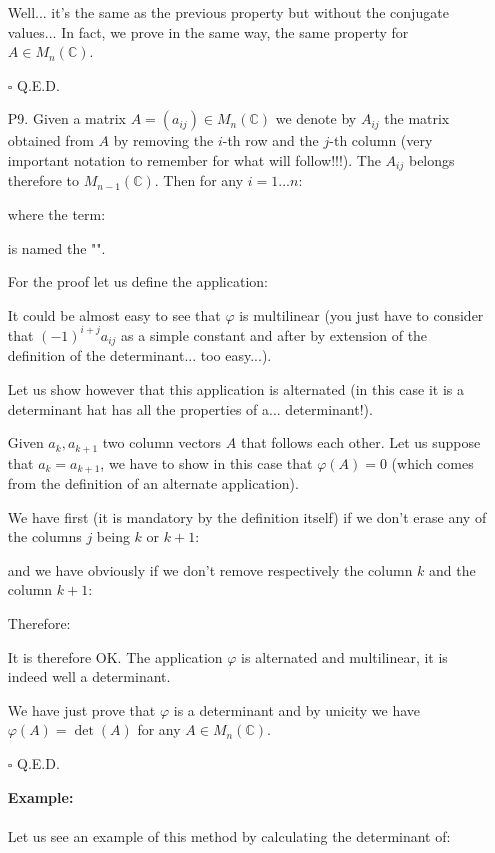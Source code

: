 \begin{enumerate}
		\begin{dem}
		Well... it's the same as the previous property but without the conjugate values... In fact, we prove in the same way, the same property for $A\in M_n(\mathbb{C})$.
		\begin{flushright}
			$\square$  Q.E.D.
		\end{flushright}
		\end{dem}
		
		\item[P9.] Given a matrix $A=(a_{ij})\in M_n(\mathbb{C})$ we denote by $A_{ij}$ the matrix obtained from $A$ by removing the $i$-th row and the $j$-th column (very important notation to remember for what will follow!!!). The $A_{ij}$ belongs therefore to $M_{n-1}(\mathbb{C})$. Then for any $i=1...n$:
		
		where the term:
		
		is named the "\index{cofactor}".
		\begin{dem}
		For the proof let us define the application:
		
		It could be almost easy to see that $\varphi$ is multilinear (you just have to consider that $(-1)^{i+j}a_{ij}$ as a simple constant and after by extension of the definition of the determinant... too easy...).

		Let us show however that this application is alternated (in this case it is a determinant hat has all the properties of a... determinant!).
	
		Given $a_k,a_{k+1}$ two column vectors $A$ that follows each other. Let us suppose that $a_k=a_{k+1}$, we have to show in this case that $\varphi(A)=0$ (which comes from the definition of an alternate application).
	
		We have first (it is mandatory by the definition itself) if we don't erase any of the columns $j$ being $k$ or $k+1$:
		
		and we have obviously if we don't remove respectively the column $k$ and the column $k+1$:
		
		Therefore:
		
		It is therefore OK. The application $\varphi$ is alternated and multilinear, it is indeed well a determinant.
		
		We have just prove that $\varphi$ is a determinant and by unicity we have $\varphi(A)=\det(A)$ for any $A\in M_n(\mathbb{C})$.
		\begin{flushright}
			$\square$  Q.E.D.
		\end{flushright}
		\end{dem}
		\begin{tcolorbox}[colframe=black,colback=white,sharp corners]
		\textbf{{\Large {}}Example:}\\\\
		Let us see an example of this method by calculating the determinant of: 
		

\end{tcolorbox}
\end{enumerate}
